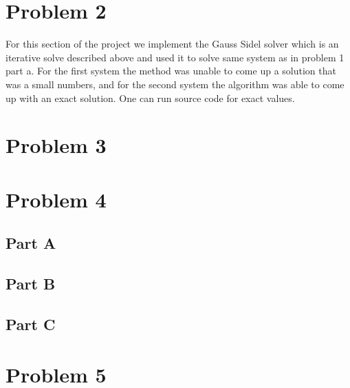 \documentclass{article}
\begin{document}
\section*{Problem 2}
For this section of the project we implement the Gauss Sidel solver which is an iterative solve described above and used it to solve same system as in problem 1 part a. For the first system the method was unable to come up a solution that was a small numbers, and for the second system the algorithm was able to come up with an exact solution. One can run source code for exact values. 

\section*{Problem 3}

\section*{Problem 4}

\subsection*{Part A}

\subsection*{Part B}

\subsection*{Part C}


\section*{Problem 5}
\end{document}
